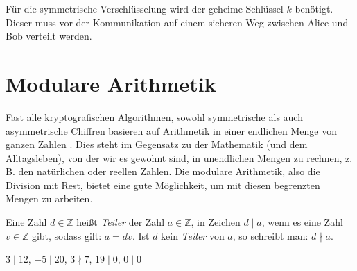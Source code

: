 \noindent
Für die symmetrische Verschlüsselung wird der geheime Schlüssel $k$ benötigt. Dieser
muss vor der Kommunikation auf einem sicheren Weg zwischen Alice und Bob verteilt werden.

\section{Modulare Arithmetik}
Fast alle kryptografischen Algorithmen, sowohl symmetrische als auch asymmetrische Chiffren
basieren auf Arithmetik in einer endlichen Menge von ganzen Zahlen \parencite[13]{BOOK:crypto}.
Dies steht im Gegensatz zu der Mathematik (und dem Alltagsleben),
von der wir es gewohnt sind, in unendlichen
Mengen zu rechnen, z.\,B. den natürlichen oder reellen Zahlen. Die modulare Arithmetik,
also die Division mit Rest, bietet eine gute Möglichkeit, um mit diesen begrenzten Mengen
zu arbeiten.

\begin{definition}
  Eine Zahl $d \in \mathbb{Z}$ heißt \textit{Teiler} der Zahl $a \in \mathbb{Z}$,
  in Zeichen $d \mid a$, wenn es eine Zahl $v \in \mathbb{Z}$ gibt, sodass gilt: $a = dv$.
  Ist $d$ kein \textit{Teiler} von $a$, so schreibt man: $d \nmid a$.
\end{definition}

\begin{example}
  $3 \mid 12$, $-5 \mid 20$, $3 \nmid 7$, $19 \mid 0$, $0 \mid 0$
\end{example}

